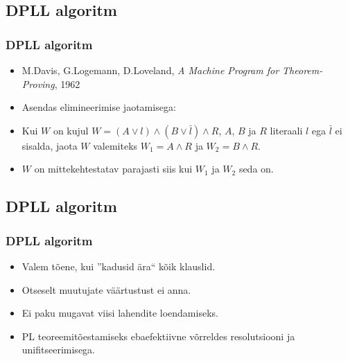 \documentclass{beamer}
\begin{document}
\subsection{DPLL algoritm}
\frame
{
	\frametitle{DPLL algoritm}
	
	\begin{itemize}
		\item M.Davis, G.Logemann, D.Loveland, \emph{A Machine Program for Theorem-Proving}, 1962
		\item Asendas elimineerimise jaotamisega:
		\item Kui $W$ on kujul $W=(A\vee l)\wedge(B\vee \bar{l})\wedge R$, $A$,
		$B$ ja $R$ literaali $l$ ega $\bar{l}$ ei sisalda, jaota $W$ valemiteks
		$W_1=A\wedge R$ ja $W_2=B\wedge R$.
		\item $W$ on mittekehtestatav parajasti siis kui $W_1$ ja $W_2$ seda on.
	\end{itemize}
}
\subsection{DPLL algoritm}
\frame
{
	\frametitle{DPLL algoritm}
	
	\begin{itemize}
		\item Valem tõene, kui ''kadusid ära`` kõik klauslid.
		\item Otseselt muutujate väärtustust ei anna.
		\item Ei paku mugavat viisi lahendite loendamiseks.
		\item PL teoreemitõestamiseks ebaefektiivne võrreldes
		resolutsiooni ja unifitseerimisega.
	\end{itemize}
}
\end{document}
